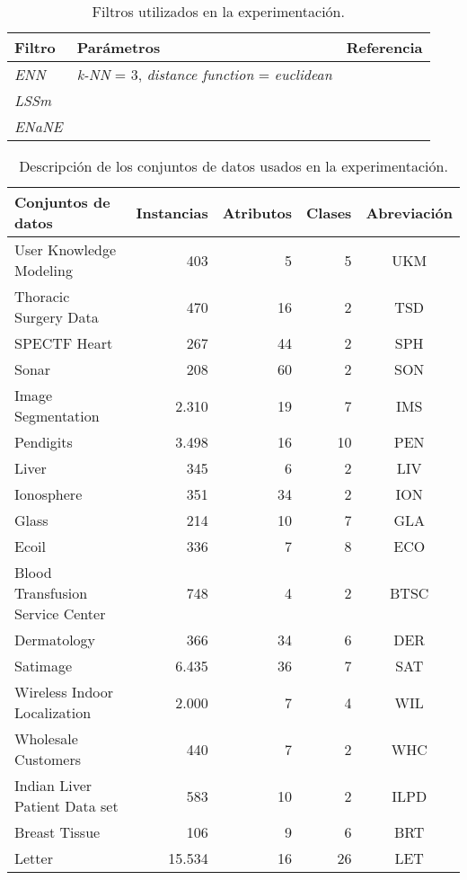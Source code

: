 \begin{table}[]
    \centering
    \begin{tabular}{llc}
	\toprule
        \textbf{Filtro} & \textbf{Parámetros} & \textbf{Referencia} \\ 
    \toprule
        \textit{ENN} & \textit{k-NN} = 3, \textit{distance function} = \textit{euclidean} & \cite{wilson1972asymptotic} \\
        \textit{LSSm} & ~ & \cite{leyva2015three} \\ 
        \textit{ENaNE} & ~ & \cite{li2019selfk} \\ 
    \bottomrule
    \end{tabular}
    \caption{Filtros utilizados en la experimentación.}\label{tab:exp:filters}
\end{table}

\begin{table}[]
    \centering
    \tiny
    \begin{tabular}{lrrrc}
		\toprule
        \textbf{Conjuntos de datos} & \textbf{Instancias} & \textbf{Atributos} & \textbf{Clases} & \textbf{Abreviación} \\ 
        \toprule
        User Knowledge Modeling & 403 & 5 & 5 & UKM \\ 
        Thoracic Surgery Data  & 470 & 16 & 2 & TSD \\
        SPECTF Heart & 267 & 44 & 2 & SPH \\
        Sonar & 208 & 60 & 2 & SON \\ 
        Image Segmentation & 2.310 & 19 & 7 & IMS \\ 
        Pendigits & 3.498 & 16 & 10 & PEN \\
        Liver  & 345 & 6 & 2 & LIV \\ 
        Ionosphere & 351 & 34 & 2 & ION \\
        Glass & 214 & 10 & 7 & GLA \\ 
        Ecoil & 336 & 7 & 8 & ECO \\ 
        Blood Transfusion Service Center & 748 & 4 & 2 & BTSC \\ 
        Dermatology  & 366 & 34 & 6 & DER \\
        Satimage & 6.435 & 36 & 7 & SAT \\ 
        Wireless Indoor Localization & 2.000 & 7 & 4 & WIL \\ 
        Wholesale Customers  & 440 & 7 & 2 & WHC \\ 
        Indian Liver Patient Data set & 583 & 10 & 2 & ILPD \\ 
        Breast Tissue & 106 & 9 & 6 & BRT \\ 
        Letter  & 15.534 & 16 & 26 & LET \\ 
        \bottomrule
    \end{tabular}
    \caption{Descripción de los conjuntos de datos usados en la experimentación.}\label{tab:exp:datasets}
\end{table}

